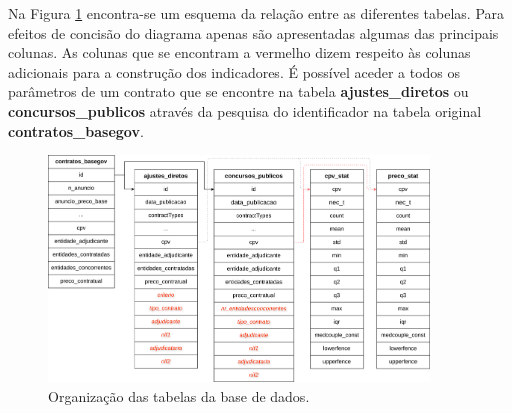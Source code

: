 \begin{table}[H]
	\centering
	\renewcommand{\arraystretch}{1.1}
	\caption{Exemplo de uma linha da tabela \textit{cpv\_stat} para concursos públicos referentes a aquisição de máquinas e equipamentos de escritório e informática, exceto móveis e pacotes de software.}
	\label{tab:cpvstat}	
\end{table}




Na Figura \ref{fig:basededados} encontra-se um esquema da relação entre as diferentes tabelas. Para efeitos de concisão do diagrama apenas são apresentadas algumas das principais colunas. As colunas que se encontram a vermelho dizem respeito às colunas adicionais para a construção dos indicadores. É possível aceder a todos os parâmetros de um contrato que se encontre na tabela \textbf{ajustes\_diretos} ou \textbf{concursos\_publicos} através da pesquisa do identificador na tabela original \textbf{contratos\_basegov}.

\begin{figure}[H]
	\centering
	\includegraphics[width=0.9\textwidth]{imagens/basedadostabelas.png}
	\caption{Organização das tabelas da base de dados.}
	\label{fig:basededados}
\end{figure}

